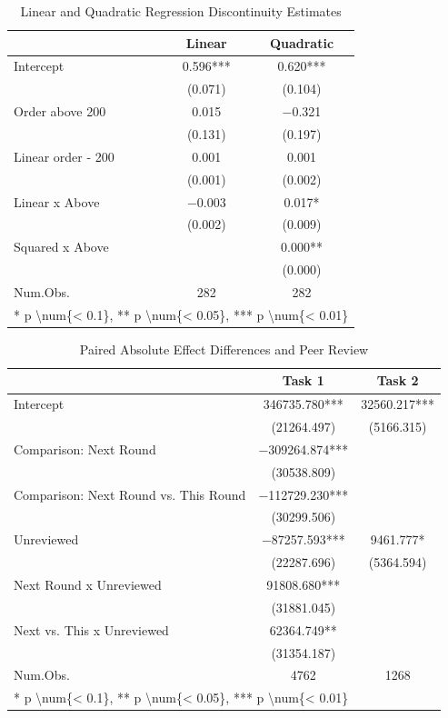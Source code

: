 \documentclass[
  letterpaper,
  DIV=11,
  numbers=noendperiod]{scrartcl}
\begin{document}
\begin{table}
\centering
\caption{Linear and Quadratic Regression Discontinuity Estimates\label{tab-rdd-reg}}
\centering
\begin{tabular}[t]{lcc}
\toprule
  & Linear & Quadratic\\
\midrule
Intercept & \num{0.596}*** & \num{0.620}***\\
 & (\num{0.071}) & (\num{0.104})\\
Order above 200 & \num{0.015} & \num{-0.321}\\
 & (\num{0.131}) & (\num{0.197})\\
Linear order - 200 & \num{0.001} & \num{0.001}\\
 & (\num{0.001}) & (\num{0.002})\\
Linear x Above & \num{-0.003} & \num{0.017}*\\
 & (\num{0.002}) & (\num{0.009})\\
Squared x Above &  & \num{0.000}**\\
 &  & (\num{0.000})\\
\midrule
Num.Obs. & \num{282} & \num{282}\\
\bottomrule
\multicolumn{3}{l}{\rule{0pt}{1em}* p \textbackslash{}num\{< 0.1\}, ** p \textbackslash{}num\{< 0.05\}, *** p \textbackslash{}num\{< 0.01\}}\\
\end{tabular}
\end{table}

\begin{table}
\centering
\caption{Paired Absolute Effect Differences and Peer Review \label{tab-peer-review-reg}}
\centering
\begin{tabular}[t]{lcc}
\toprule
  & Task 1 & Task 2\\
\midrule
Intercept & \num{346735.780}*** & \num{32560.217}***\\
 & (\num{21264.497}) & (\num{5166.315})\\
Comparison: Next Round & \num{-309264.874}*** & \\
 & (\num{30538.809}) & \\
Comparison: Next Round vs. This Round & \num{-112729.230}*** & \\
 & (\num{30299.506}) & \\
Unreviewed & \num{-87257.593}*** & \num{9461.777}*\\
 & (\num{22287.696}) & (\num{5364.594})\\
Next Round x Unreviewed & \num{91808.680}*** & \\
 & (\num{31881.045}) & \\
Next vs. This x Unreviewed & \num{62364.749}** & \\
 & (\num{31354.187}) & \\
\midrule
Num.Obs. & \num{4762} & \num{1268}\\
\bottomrule
\multicolumn{3}{l}{\rule{0pt}{1em}* p \textbackslash{}num\{< 0.1\}, ** p \textbackslash{}num\{< 0.05\}, *** p \textbackslash{}num\{< 0.01\}}\\
\end{tabular}
\end{table}
\end{document}
